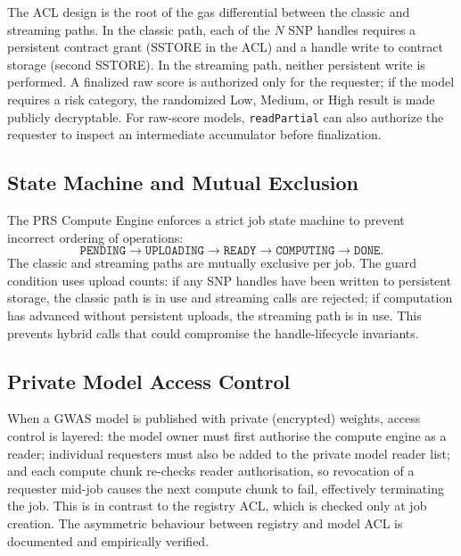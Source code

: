 \documentclass[10pt]{article}
\begin{document}
The ACL design is the root of the gas differential between the classic and streaming
paths.  In the classic path, each of the $N$ SNP handles requires a persistent contract
grant (SSTORE in the ACL) and a handle write to contract storage (second SSTORE).  In
the streaming path, neither persistent write is performed.  A finalized raw score is
authorized only for the requester; if the model requires a risk category, the randomized
Low, Medium, or High result is made publicly decryptable.  For raw-score models,
\texttt{readPartial} can also authorize the requester to inspect an intermediate
accumulator before finalization.

\subsection{State Machine and Mutual Exclusion}

The PRS Compute Engine enforces a strict job state machine to prevent incorrect
ordering of operations:
\begin{equation*}
\texttt{PENDING} \!\to\! \texttt{UPLOADING}
\!\to\! \texttt{READY}
\!\to\! \texttt{COMPUTING} \!\to\! \texttt{DONE}.
\end{equation*}
The classic and streaming paths are mutually exclusive per job.  The guard condition
uses upload counts: if any SNP handles have been written to persistent storage, the
classic path is in use and streaming calls are rejected; if computation has advanced
without persistent uploads, the streaming path is in use.  This prevents hybrid
calls that could compromise the handle-lifecycle invariants.

\subsection{Private Model Access Control}

When a GWAS model is published with private (encrypted) weights, access control is
layered: the model owner must first authorise the compute engine as a reader; individual
requesters must also be added to the private model reader list; and each compute chunk
re-checks reader authorisation, so revocation of a requester mid-job causes the next
compute chunk to fail, effectively terminating the job.  This is in contrast to the
registry ACL, which is checked only at job creation.  The asymmetric behaviour between
registry and model ACL is documented and empirically verified.

\end{document}
